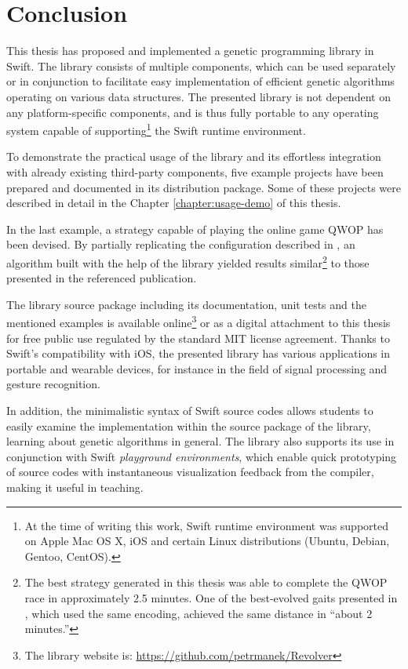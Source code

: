 \chapter{Conclusion}

This thesis has proposed and implemented a genetic programming library in Swift. The library consists of multiple components, which can be used separately or in conjunction to facilitate easy implementation of efficient genetic algorithms operating on various data structures. The presented library is not dependent on any platform-specific components, and is thus fully portable to any operating system capable of supporting\footnote{At the time of writing this work, Swift runtime environment was supported on Apple Mac OS X, iOS and certain Linux distributions (Ubuntu, Debian, Gentoo, CentOS).} the Swift runtime environment. 

To demonstrate the practical usage of the library and its effortless integration with already existing third-party components, five example projects have been prepared and documented in its distribution package. Some of these projects were described in detail in the Chapter \ref{chapter:usage-demo} of this thesis.

In the last example, a strategy capable of playing the online game QWOP \cite{QwopWebsite} has been devised. By partially replicating the configuration described in \cite{EvolvingQwopGaits}, an algorithm built with the help of the library yielded results similar\footnote{The best strategy generated in this thesis was able to complete the QWOP race in approximately 2.5 minutes. One of the best-evolved gaits presented in \cite{EvolvingQwopGaits}, which used the same encoding, achieved the same distance in ``about 2 minutes.''} to those presented in the referenced publication.

The library source package including its documentation, unit tests and the mentioned examples is available online\footnote{The library website is: \url{https://github.com/petrmanek/Revolver}} or as a digital attachment to this thesis for free public use regulated by the standard MIT license agreement. Thanks to Swift's compatibility with iOS, the presented library has various applications in portable and wearable devices, for instance in the field of signal processing and gesture recognition.

In addition, the minimalistic syntax of Swift source codes allows students to easily examine the implementation within the source package of the library, learning about genetic algorithms in general. The library also supports its use in conjunction with Swift \textit{playground environments}, which enable quick prototyping of source codes with instantaneous visualization feedback from the compiler, making it useful in teaching.

